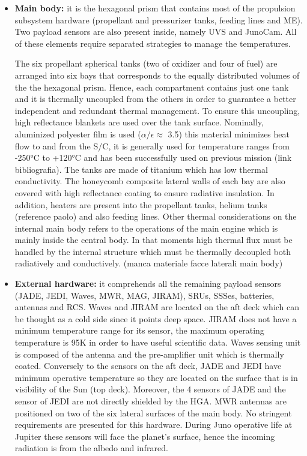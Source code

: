 \begin{itemize}
    \item \textbf{Main body:} it is the hexagonal prism that contains most of the propulsion subsystem hardware (propellant and pressurizer tanks, feeding lines and ME). Two payload sensors are also present inside, namely UVS and JunoCam. All of these elements require separated strategies to manage the temperatures. 
    
    The six propellant spherical tanks (two of oxidizer and four of fuel) are arranged into six bays that corresponds to the equally distributed volumes of the the hexagonal prism. Hence, each compartment contains just one tank and it is thermally uncoupled from the others in order to guarantee a better independent and redundant thermal management. To ensure this uncoupling, high reflectance blankets are used over the tank surface. Nominally, aluminized polyester film is used ($\alpha / \epsilon \approx$ 3.5) this material minimizes heat flow to and from the S/C, it is generally used for temperature ranges from -250°C to +120°C and has been successfully used on previous mission (link bibliografia). The tanks are made of titanium which has low thermal conductivity. 
    The honeycomb composite lateral walls of each bay are also covered with high reflectance coating to ensure radiative insulation.
    In addition, heaters are present into the propellant tanks, helium tanks (reference paolo) and also feeding lines. \mref
    Other thermal considerations on the internal main body refers to the  operations of the main engine which is mainly inside the central body. In that moments high thermal flux must be handled by the internal structure which must be thermally decoupled both radiatively and conductively. (manca materiale facce laterali main body)
    \item \textbf{External hardware:} it comprehends all the remaining payload sensors (JADE, JEDI, Waves, MWR, MAG, JIRAM), SRUs, SSSes, batteries, antennas and RCS. Waves and JIRAM are located on the aft deck which can be thought as a cold side since it points deep space. JIRAM does not have a minimum temperature range for its sensor, the maximum operating temperature is 95K in order to have useful scientific data. Waves sensing unit is composed of the antenna and the pre-amplifier unit which is thermally coated. Conversely to the sensors on the aft deck, JADE and JEDI have minimum operative temperature so they are located on the surface that is in visibility of the Sun (top deck). Moreover, the 4 sensors of JADE and the sensor of JEDI are not directly shielded by the HGA. MWR antennas are positioned on two of the six lateral surfaces of the main body. No stringent requirements are presented for this hardware. During Juno operative life at Jupiter these sensors will face the planet's surface, hence the incoming radiation is from the albedo and infrared. 

\end{itemize}
